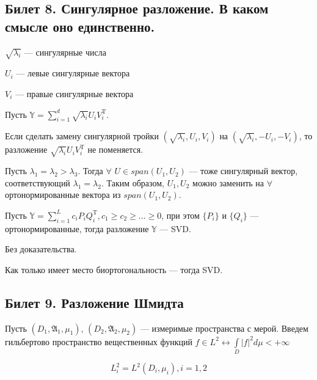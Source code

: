 \subsection{Билет 8. Сингулярное разложение. В каком смысле оно единственно.}

\begin{design}[1]
$\sqrt{\lambda_i}$ --- сингулярные числа
\end{design}
\begin{design}[2]
$U_i$ --- левые сингулярные вектора
\end{design}
\begin{design}[3]
$V_i$ --- правые сингулярные вектора
\end{design}

Пусть $\mathbb{Y} = \sum \limits_{i = 1}^d \sqrt{\lambda_i} U_i V_i^{\mathrm{T}}$.

Если сделать замену сингулярной тройки $(\sqrt{\lambda_i}, U_i, V_i)$ на $(\sqrt{\lambda_i}, -U_i, -V_i)$, то разложение $\sqrt{\lambda_i} U_i V_i^{\mathrm{T}}$ не поменяется.

Пусть $\lambda_1 = \lambda_2 > \lambda_3$. Тогда $\forall$ $U \in span(U_1, U_2)$ --- тоже сингулярный вектор, соответствующий $\lambda_1 = \lambda_2$. Таким образом, $U_1, U_2$ можно заменить на $\forall$ ортонормированные вектора из $span(U_1,U_2)$.

\begin{sug}
Пусть $\mathbb{Y} = \sum \limits_{i = 1}^L c_i P_i Q_i^{\mathrm{T}}, c_1 \geqslant c_2 \geqslant \dots \geqslant 0$, при этом $\{P_i\}$ и $\{Q_i\}$ --- ортонормированные, тогда разложение $\mathbb{Y}$ --- SVD.
\end{sug}

Без доказательства.

\begin{note}
Как только имеет место биортогональность --- тогда SVD.
\end{note}


\subsection{Билет 9. Разложение Шмидта}

Пусть $(D_1, \mathfrak{A}_1, \mu_1)$, $(D_2, \mathfrak{A}_2, \mu_2)$ --- измеримые пространства с мерой. Введем гильбертово пространство вещественных функций $f \in L^2 \leftrightarrow \int \limits_{D} |f|^2 d\mu < + \infty$

\begin{equation*}
L_i^2 = L^2(D_i,\mu_i), i = 1,2
\end{equation*}

